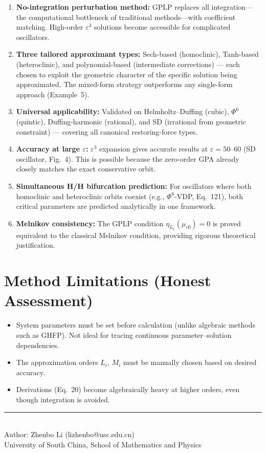 \documentclass[11pt,a4paper]{article}
\begin{document}
\begin{enumerate}[leftmargin=2em]
\item \textbf{No-integration perturbation method:} GPLP replaces all integration---the computational bottleneck of traditional methods---with coefficient matching. High-order $\varepsilon^3$ solutions become accessible for complicated oscillators.
\item \textbf{Three tailored approximant types:} Sech-based (homoclinic), Tanh-based (heteroclinic), and polynomial-based (intermediate corrections) --- each chosen to exploit the geometric character of the specific solution being approximated. The mixed-form strategy outperforms any single-form approach (Example~5).
\item \textbf{Universal applicability:} Validated on Helmholtz--Duffing (cubic), $\Phi^6$ (quintic), Duffing-harmonic (rational), and SD (irrational from geometric constraint) --- covering all canonical restoring-force types.
\item \textbf{Accuracy at large $\varepsilon$:} $\varepsilon^3$ expansion gives accurate results at $\varepsilon=50$--$60$ (SD oscillator, Fig.\ 4). This is possible because the zero-order GPA already closely matches the exact conservative orbit.
\item \textbf{Simultaneous H/H bifurcation prediction:} For oscillators where both homoclinic and heteroclinic orbits coexist (e.g., $\Phi^6$-VDP, Eq.\ 121), both critical parameters are predicted analytically in one framework.
\item \textbf{Melnikov consistency:} The GPLP condition $\eta_{L_1}(\mu_{c0})=0$ is proved equivalent to the classical Melnikov condition, providing rigorous theoretical justification.
\end{enumerate}

\section{Method Limitations (Honest Assessment)}

\begin{itemize}[leftmargin=2em]
\item System parameters must be set before calculation (unlike algebraic methods such as GHFP). Not ideal for tracing continuous parameter--solution dependencies.
\item The approximation orders $L_i$, $M_i$ must be manually chosen based on desired accuracy.
\item Derivations (Eq.\ 20) become algebraically heavy at higher orders, even though integration is avoided.
\end{itemize}

\vfill
\begin{center}
\small\rule{0.5\textwidth}{0.3pt}\\[4pt]
\small\color{primary} Author: Zhenbo Li (lizhenbo@usc.edu.cn)\\
\small University of South China, School of Mathematics and Physics
\end{center}
\end{document}
